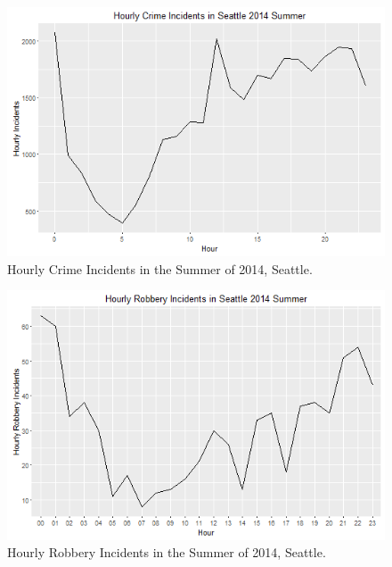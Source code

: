\documentclass[a4paper]{article}
\begin{document}
\begin{figure}
\centering
\includegraphics[width=1\textwidth]{HourlyCrime.png}
\caption{\label{fig:dailycrime}Hourly Crime Incidents in the Summer of 2014, Seattle.}
\end{figure}

\begin{figure}
\centering
\includegraphics[width=1\textwidth]{HourlyRobbery.png}
\caption{\label{fig:dailyrobbery}Hourly Robbery Incidents in the Summer of 2014, Seattle.}
\end{figure}
\end{document}
